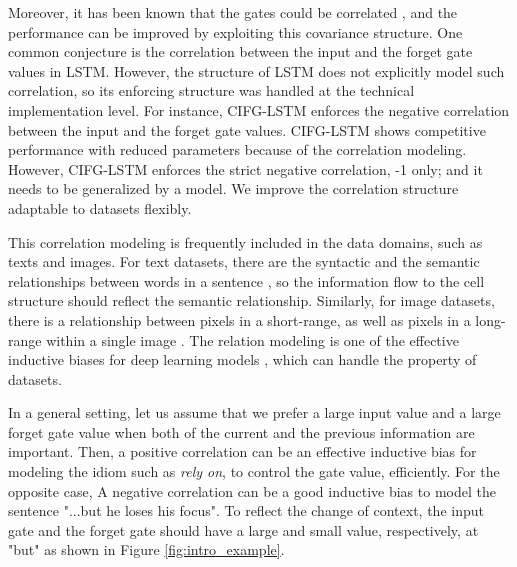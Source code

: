 \documentclass[letterpaper]{article} %
\begin{document}
Moreover, it has been known that the gates could be correlated \cite{greff2017lstm}, and the performance can be improved by exploiting this covariance structure. One common conjecture is the correlation between the input and the forget gate values in LSTM. However, the structure of LSTM does not explicitly model such correlation, so its enforcing structure was handled at the technical implementation level. For instance, CIFG-LSTM \cite{greff2017lstm} enforces the negative correlation between the input and the forget gate values. CIFG-LSTM shows competitive performance with reduced parameters because of the correlation modeling. However, CIFG-LSTM enforces the strict negative correlation, -1 only; and it needs to be generalized by a model. We improve the correlation structure adaptable to datasets flexibly. %

This correlation modeling is frequently included in the data domains, such as texts and images. For text datasets, there are the syntactic and the semantic relationships between words in a sentence \cite{harabagiu2004incremental}, so the information flow to the cell structure should reflect the semantic relationship. Similarly, for image datasets, there is a relationship between pixels in a short-range, as well as pixels in a long-range within a single image \cite{kampffmeyer2019connnet}. The relation modeling is one of the effective inductive biases for deep learning models \cite{battaglia2018relational}, which can handle the property of datasets.
 
In a general setting, let us assume that we prefer a large input value and a large forget gate value when both of the current and the previous information are important. Then, a positive correlation can be an effective inductive bias for modeling the idiom such as \textit{rely on}, to control the gate value, efficiently. 
For the opposite case, 
A negative correlation can be a good inductive bias to model the sentence "...but he loses his focus". To reflect the change of context, the input gate and the forget gate should have a large and small value, respectively, at "but" as shown in Figure \ref{fig:intro_example}. 
\end{document}
